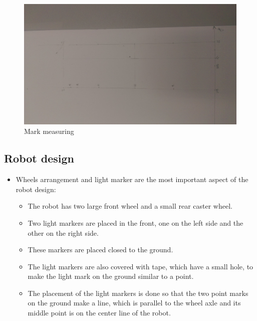 \documentclass[paper=a4, fontsize=11pt]{scrartcl} %
\begin{document}
    \begin{figure}[h!]
        \centering
        \includegraphics[width=0.9\linewidth]{images/IMAG0148}
        \caption{Mark measuring}
        \label{fig:img6}
    \end{figure}
    
    \subsection{Robot design}
    \begin{itemize}
        \item Wheels arrangement and light marker are the most important aspect of the robot design:
        \begin{itemize}
            \item The robot has two large front wheel and a small rear caster wheel.
            \item Two light markers are placed in the front, one on the left side and the other on the right side.
            \item These markers are placed closed to the ground.
            \item The light markers are also covered with tape, which have a small hole, to make the light mark on the ground similar to a point.
            \item The placement of the light markers is done so that the two point marks on the ground make a line, which is parallel to the wheel axle and its middle point is on the center line of the robot.
        \end{itemize}
    \end{itemize}

    \pagebreak
\end{document}
